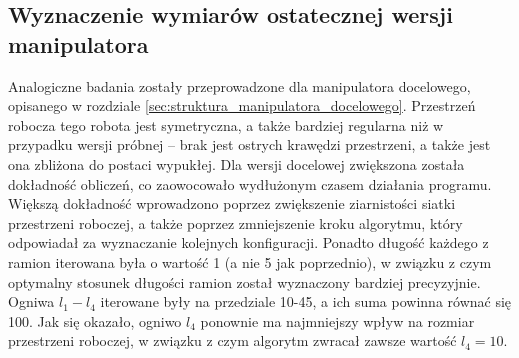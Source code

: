 \documentclass[printmode]{mgr}
\begin{document}
\subsection{Wyznaczenie wymiarów ostatecznej wersji manipulatora}
Analogiczne badania zostały przeprowadzone dla manipulatora docelowego, opisanego w rozdziale \ref{sec:struktura_manipulatora_docelowego}.
Przestrzeń robocza tego robota jest symetryczna, a także bardziej regularna niż w przypadku wersji próbnej -- brak jest ostrych krawędzi przestrzeni,
a także jest ona zbliżona do postaci wypukłej. Dla wersji docelowej zwiększona została dokładność obliczeń, co zaowocowało wydłużonym czasem działania
programu. Większą dokładność wprowadzono poprzez zwiększenie ziarnistości siatki przestrzeni roboczej, a także poprzez zmniejszenie kroku algorytmu,
który odpowiadał za wyznaczanie kolejnych konfiguracji. Ponadto długość każdego z ramion iterowana była o wartość 1 (a nie 5 jak poprzednio), 
w związku z czym optymalny stosunek długości ramion został wyznaczony bardziej precyzyjnie. Ogniwa $l_1-l_4$ iterowane były na przedziale
10-45, a ich suma powinna równać się 100. Jak się okazało, ogniwo $l_4$ ponownie ma najmniejszy wpływ na rozmiar przestrzeni roboczej,
w związku z czym algorytm zwracał zawsze wartość $l_4=10$.
\end{document}
